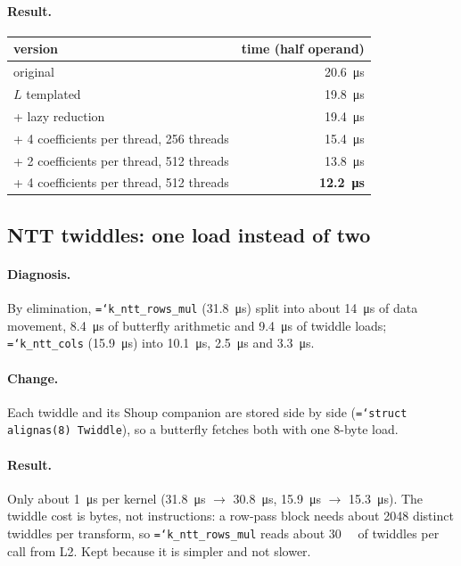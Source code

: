 \documentclass[11pt,a4paper]{article}
\newcommand{\code}[1]{\texttt{\hyphenchar\font=`\-\relax #1}}
\newcommand{\us}[1]{\SI{#1}{\micro\second}}
\newcommand{\MB}[1]{\SI{#1}{\mega\byte}}
\begin{document}
\paragraph{Result.}
\begin{center}
\begin{tabular}{lr}
\toprule
version & time (half operand) \\
\midrule
original & \us{20.6} \\
$L$ templated & \us{19.8} \\
\quad + lazy reduction & \us{19.4} \\
\quad + 4 coefficients per thread, 256 threads & \us{15.4} \\
\quad + 2 coefficients per thread, 512 threads & \us{13.8} \\
\quad + 4 coefficients per thread, 512 threads & \textbf{\us{12.2}} \\
\bottomrule
\end{tabular}
\end{center}

\subsection{NTT twiddles: one load instead of two}

\paragraph{Diagnosis.} By elimination, \code{k\_ntt\_rows\_mul} (\us{31.8}) split into
about \us{14} of data movement, \us{8.4} of butterfly arithmetic and \us{9.4} of
twiddle loads; \code{k\_ntt\_cols} (\us{15.9}) into \us{10.1}, \us{2.5} and \us{3.3}.

\paragraph{Change.} Each twiddle and its Shoup companion are stored side by side
(\code{struct alignas(8) Twiddle}), so a butterfly fetches both with one 8-byte load.

\paragraph{Result.} Only about \us{1} per kernel (\us{31.8} $\to$ \us{30.8}, \us{15.9}
$\to$ \us{15.3}). The twiddle cost is bytes, not instructions: a row-pass block needs
about 2048 distinct twiddles per transform, so \code{k\_ntt\_rows\_mul} reads about
\MB{30} of twiddles per call from L2. Kept because it is simpler and not slower.
\end{document}

